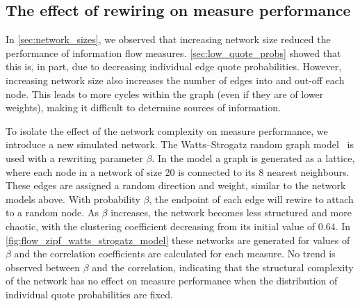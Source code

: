 \subsection{The effect of rewiring on measure performance}
In \autoref{sec:network_sizes}, we observed that increasing network size reduced the performance of information flow measures. \autoref{sec:low_quote_probs} showed that this is, in part, due to decreasing individual edge quote probabilities. However, increasing network size also increases the number of edges into and out-off each node. This leads to more cycles within the graph (even if they are of lower weights), making it difficult to determine sources of information. 

To isolate the effect of the network complexity on measure performance, we introduce a new simulated network. The Watts–Strogatz random graph model~\cite{watts_collective_1998} is used with a rewriting parameter $\beta$. In the model a graph is generated as a lattice, where each node in a network of size 20 is connected to its 8 nearest neighbours. These edges are assigned a random direction and weight, similar to the network models above. With probability $\beta$, the endpoint of each edge will rewire to attach to a random node. As $\beta$ increases, the network becomes less structured and more chaotic, with the clustering coefficient decreasing from its initial value of 0.64. In \autoref{fig:flow_zipf_watts_strogatz_model} these networks are generated for values of $\beta$ and the correlation coefficients are calculated for each measure. No trend is observed between $\beta$ and the correlation, indicating that the structural complexity of the network has no effect on measure performance when the distribution of individual quote probabilities are fixed. 

